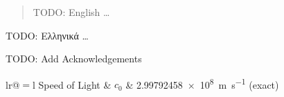 \documentclass[
	12pt, %
	english, %
	onehalfspacing, %
	liststotoc, %
	toctotoc, %
	parskip, %
	headsepline, %
]{MastersDoctoralThesis} %
\begin{document}

\begin{abstract}
	\addchaptertocentry{\abstractname} %
	TODO: English
	\ldots
\end{abstract}


\begin{extraAbstract}
	\addchaptertocentry{\abstractname} %
	TODO: Ελληνικά
	\ldots
\end{extraAbstract}


\begin{acknowledgements}
	\addchaptertocentry{\acknowledgementname} %
	TODO: Add Acknowledgements
\end{acknowledgements}


\tableofcontents %
\listoffigures %
\listoftables %
\listofalgorithms %



\begin{constants}{lr@{${}={}$}l} %
	Speed of Light & $c_{0}$ & \SI{2.99792458e8}{\meter\per\second} (exact)\\
\end{constants}
\end{document}
